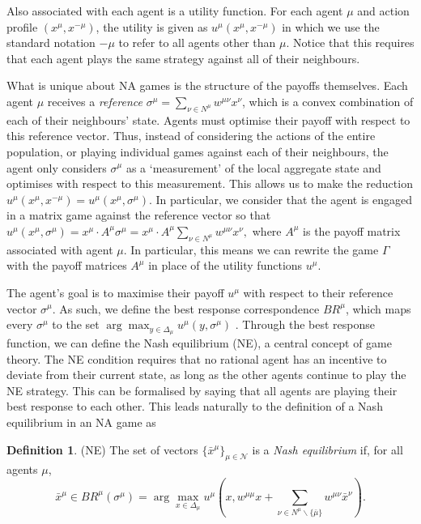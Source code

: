 \documentclass{article}
\theoremstyle{definition}
\newtheorem{definition}{Definition}
\newcommand{\agentset}{\mathcal{N}}
\newcommand{\utility}[1]{u^{#1}}
\newcommand{\wmunu}{w^{\mu \nu}}
\newcommand{\xmu}{x^{\mu}}
\newcommand{\xnu}{x^{\nu}}
\newcommand{\refmu}{\sigma^{\mu}}
\newcommand{\NE}[1]{\bar{x}^{#1}}
\newcommand{\weightedsum}{ \sum_{\nu \in N^\mu} \wmunu \xnu}
\newcommand{\xnotmu}{x^{-\mu}}
\begin{document}
Also associated with each agent is a utility
function. For each agent $\mu$ and action profile
$(\xmu, \xnotmu)$, the utility is given as $u^\mu(\xmu, \xnotmu)$ in which we
use the standard notation $-\mu$ to refer to all agents other than
$\mu$. Notice that this requires that each agent plays the same
strategy against all of their neighbours. 

What is unique about 
NA games is the structure of the payoffs themselves.
Each agent $\mu$ receives a {\em reference} $\sigma^{\mu} = \sum_{\nu \in N^\mu} \wmunu \xnu$, which is a convex combination
of each of their neighbours' state. Agents must optimise their payoff with respect to this
reference vector. Thus, instead of considering
the actions of the entire population, or playing individual games
against each of their neighbours, the agent only considers
$\sigma^\mu$ as a `measurement' of the local aggregate state and
optimises with respect to this measurement. This allows us to make
the reduction $u^\mu(\xmu, \xnotmu) = u^\mu(\xmu, \refmu)$. In
particular, we consider that the agent is engaged in a matrix game
against the reference vector so that
$
	u^\mu(\xmu, \refmu) = \xmu \cdot A^\mu \refmu = \xmu
	\cdot A^\mu \weightedsum,
$
%
where $A^\mu$ is the payoff matrix associated with agent $\mu$. In particular,  this means we can rewrite the game $\Gamma$ with the payoff
matrices $A^\mu$ in place of the utility functions
$\utility{\mu}$. 

The agent's goal is to maximise their payoff $u^\mu$ with respect to
their reference vector $\refmu$. As such, we define the best response
correspondence $BR^\mu$, which maps every $\refmu$ to the set $\arg
\max_{y \in \Delta_\mu} {u^\mu(y, \refmu)}$
\cite{Ostrovski2014}. Through the best response function, we can
define the Nash equilibrium (NE), a central concept of game
theory. The NE condition requires that no rational agent has an
incentive to deviate from their current state, as long as the other
agents continue to play the NE strategy. This can be formalised by
saying that all agents are playing their best response to each other.
%
This leads naturally to the definition of a Nash equilibrium in an NA game as
%
\begin{definition}(NE) \label{def::NE}
	The set of vectors $\{ \NE{\mu}\}_{\mu \in \agentset}$ is a {\em
		Nash equilibrium} if, for all agents $\mu$,
	\begin{equation*}
		\NE{\mu} \in BR^\mu (\refmu) = \arg \max_{x \in \Delta_\mu} u^\mu(x, w^{\mu \mu} x + \sum_{\nu \in N^\mu \backslash \{\bar{\mu}\}} \wmunu \NE{\nu}).
	\end{equation*} 
\end{definition}
\end{document}
